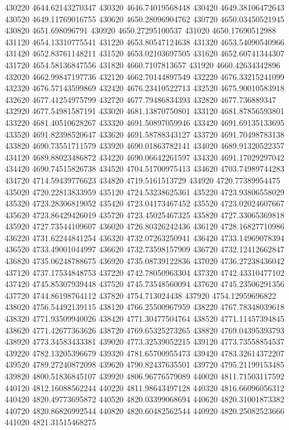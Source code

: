 {430220 4644.62143270347
430320 4646.74019568448
430420 4649.38106472643
430520 4649.11769016755
430620 4650.28096904762
430720 4650.03450521945
430820 4651.698096791
430920 4650.27295100537
431020 4650.17690512988
431120 4654.13310775541
431220 4653.80547124638
431320 4653.54090540966
431420 4652.83761148211
431520 4653.02103697505
431620 4652.60741344307
431720 4654.58136847556
431820 4660.7107813657
431920 4660.42634342896
432020 4662.99847197736
432120 4662.70144897549
432220 4676.33215241099
432320 4676.57143599869
432420 4676.23410522713
432520 4675.90010583918
432620 4677.41254975799
432720 4677.79486834393
432820 4677.736889347
432920 4677.54981587191
433020 4681.13870750801
433120 4681.87856593801
433220 4681.40510628267
433320 4691.50897059946
433420 4691.69135133695
433520 4691.82398520647
433620 4691.58788343127
433720 4691.70498783138
433820 4690.73551711579
433920 4690.01863782141
434020 4689.91320522357
434120 4689.88023486872
434220 4690.06642261597
434320 4691.17029297042
434420 4690.74515826738
434520 4704.51700975413
434620 4703.74989744283
434720 4714.59439776623
434820 4719.5161513729
434920 4720.77389954475
435020 4720.22813833959
435120 4724.53238625361
435220 4723.93806558029
435320 4723.28306819052
435420 4723.04173467452
435520 4723.02024607667
435620 4723.86429426019
435720 4723.45025467325
435820 4727.33065369818
435920 4727.73544109607
436020 4726.80326242436
436120 4728.16827710986
436220 4731.62244841254
436320 4732.07263250941
436420 4733.14969078394
436520 4733.49001044997
436620 4732.73598157909
436720 4732.12412662847
436820 4735.06248788675
436920 4735.08739122836
437020 4736.27238436042
437120 4737.17534848753
437220 4742.78050963304
437320 4742.43310477102
437420 4745.85307939448
437520 4745.73548560094
437620 4745.23506291356
437720 4744.86198764112
437820 4754.713024438
437920 4754.12959696822
438020 4756.54492139115
438120 4766.25500967959
438220 4767.78348039618
438320 4771.93509940026
438420 4771.30477504764
438520 4771.11457394845
438620 4771.42677363626
438720 4769.65325273265
438820 4769.04395393793
438920 4773.34583433381
439020 4773.32539052215
439120 4773.73558854537
439220 4782.13205396679
439320 4781.65700955473
439420 4783.32614372207
439520 4789.27240872098
439620 4790.82437635501
439720 4795.21199153485
439820 4800.51836845107
439920 4806.96776579089
440020 4811.71503117592
440120 4812.16088562244
440220 4811.98643497128
440320 4816.66096056312
440420 4820.49773695872
440520 4820.03399068694
440620 4820.31001873382
440720 4820.86826992544
440820 4820.60482562544
440920 4820.25082523666
441020 4821.31515468275
}
